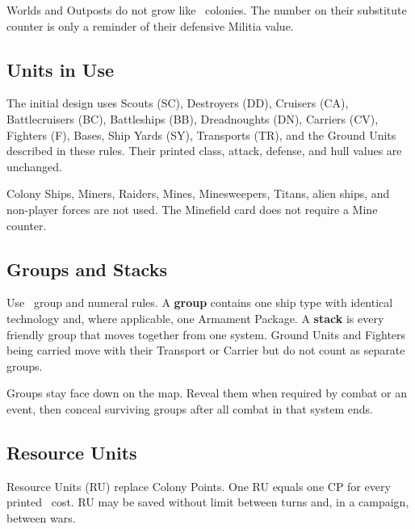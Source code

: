 Worlds and Outposts do not grow like \SpaceEmpires\ colonies. The number on
their substitute counter is only a reminder of their defensive Militia value.

\subsection{Units in Use}

The initial design uses Scouts (SC), Destroyers (DD), Cruisers (CA),
Battlecruisers (BC), Battleships (BB), Dreadnoughts (DN), Carriers (CV),
Fighters (F), Bases, Ship Yards (SY), Transports (TR), and the Ground Units
described in these rules. Their printed class, attack, defense, and hull values
are unchanged.

Colony Ships, Miners, Raiders, Mines, Minesweepers, Titans, alien ships, and
non-player forces are not used. The Minefield card does not require a Mine
counter.

\subsection{Groups and Stacks}

Use \SpaceEmpires\ group and numeral rules. A \textbf{group} contains one ship
type with identical technology and, where applicable, one Armament Package. A
\textbf{stack} is every friendly group that
moves together from one system. Ground Units and Fighters being carried move
with their Transport or Carrier but do not count as separate groups.

Groups stay face down on the map. Reveal them when required by combat or an
event, then conceal surviving groups after all combat in that system ends.

\subsection{Resource Units}

Resource Units (RU) replace Colony Points. One RU equals one CP for every
printed \SpaceEmpires\ cost. RU may be saved without limit between turns and,
in a campaign, between wars.
